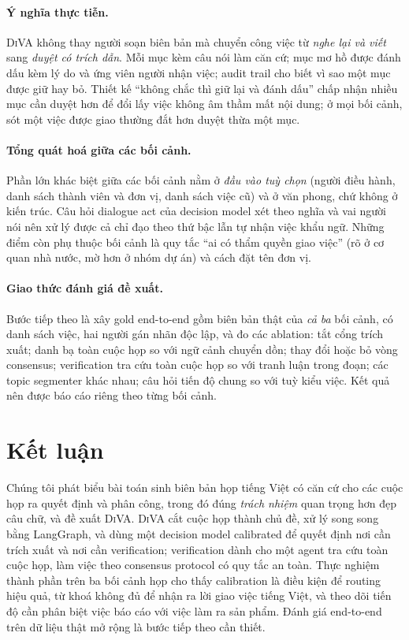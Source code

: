 \documentclass[11pt]{article}
\newcommand{\diva}{\textsc{DiVA}}
\begin{document}
\paragraph{Ý nghĩa thực tiễn.} \diva{} không thay người soạn biên bản mà chuyển công việc từ \emph{nghe
lại và viết} sang \emph{duyệt có trích dẫn}. Mỗi mục kèm câu nói làm căn cứ; mục mơ hồ được đánh dấu kèm
lý do và ứng viên người nhận việc; audit trail cho biết vì sao một mục được giữ hay bỏ. Thiết kế
``không chắc thì giữ lại và đánh dấu'' chấp nhận nhiều mục cần duyệt hơn để đổi lấy việc không âm thầm mất
nội dung; ở mọi bối cảnh, sót một việc được giao thường đắt hơn duyệt thừa một mục.

\paragraph{Tổng quát hoá giữa các bối cảnh.} Phần lớn khác biệt giữa các bối cảnh nằm ở \emph{đầu vào
tuỳ chọn} (người điều hành, danh sách thành viên và đơn vị, danh sách việc cũ) và ở văn phong, chứ không ở
kiến trúc. Câu hỏi dialogue act của decision model xét theo nghĩa và vai người nói nên xử lý được cả chỉ đạo theo thứ
bậc lẫn tự nhận việc khẩu ngữ. Những điểm còn phụ thuộc bối cảnh là quy tắc ``ai có thẩm quyền giao việc''
(rõ ở cơ quan nhà nước, mờ hơn ở nhóm dự án) và cách đặt tên đơn vị.

\paragraph{Giao thức đánh giá đề xuất.} Bước tiếp theo là xây gold end-to-end gồm biên bản thật của
\emph{cả ba} bối cảnh, có danh sách việc, hai người gán nhãn độc lập, và đo các ablation: tắt cổng trích
xuất; danh bạ toàn cuộc họp so với ngữ cảnh chuyển dồn; thay đổi hoặc bỏ vòng consensus; verification tra
cứu toàn cuộc họp so với tranh luận trong đoạn; các topic segmenter khác nhau; câu hỏi tiến độ chung so với
tuỳ kiểu việc. Kết quả nên được báo cáo riêng theo từng bối cảnh.

\section{Kết luận}

Chúng tôi phát biểu bài toán sinh biên bản họp tiếng Việt có căn cứ cho các cuộc họp ra quyết định và
phân công, trong đó đúng \emph{trách nhiệm} quan trọng hơn đẹp câu chữ, và đề xuất \diva{}. \diva{} cắt
cuộc họp thành chủ đề, xử lý song song bằng LangGraph, và dùng một decision model calibrated để quyết
định nơi cần trích xuất và nơi cần verification; verification dành cho một agent tra cứu toàn cuộc họp,
làm việc theo consensus protocol có quy tắc an toàn. Thực nghiệm thành phần trên ba bối cảnh họp cho thấy
calibration là điều kiện để routing hiệu quả, từ khoá không đủ để nhận ra lời giao việc tiếng
Việt, và theo dõi tiến độ cần phân biệt việc báo cáo với việc làm ra sản phẩm. Đánh giá end-to-end trên dữ
liệu thật mở rộng là bước tiếp theo cần thiết.
\end{document}
